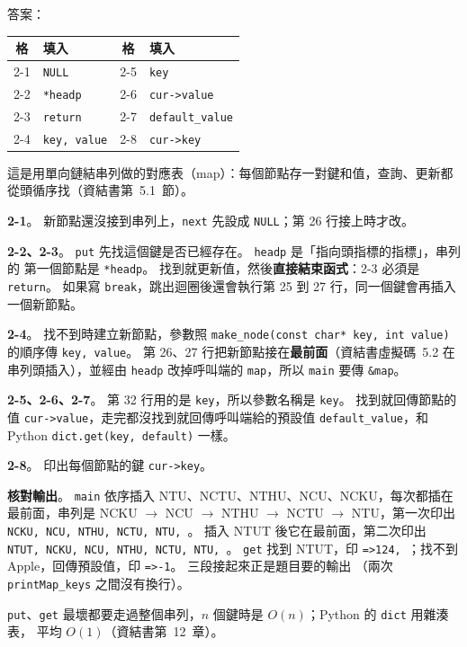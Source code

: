 \begin{pastsoln}
答案：
\begin{center}
\small
\begin{tabular}{cl|cl}
\toprule
格 & 填入 & 格 & 填入 \\
\midrule
2-1 & \texttt{NULL} & 2-5 & \texttt{key} \\
2-2 & \texttt{*headp} & 2-6 & \texttt{cur->value} \\
2-3 & \texttt{return} & 2-7 & \texttt{default\_value} \\
2-4 & \texttt{key, value} & 2-8 & \texttt{cur->key} \\
\bottomrule
\end{tabular}
\end{center}

這是用單向鏈結串列做的對應表（map）：每個節點存一對鍵和值，查詢、更新都從頭循序找（資結書第~5.1~節）。

\textbf{2-1}。 新節點還沒接到串列上，\texttt{next} 先設成 \texttt{NULL}；第 26 行接上時才改。

\textbf{2-2、2-3}。 \texttt{put} 先找這個鍵是否已經存在。 \texttt{headp} 是「指向頭指標的指標」，串列的
第一個節點是 \texttt{*headp}。 找到就更新值，然後\textbf{直接結束函式}：2-3 必須是 \texttt{return}。
如果寫 \texttt{break}，跳出迴圈後還會執行第 25 到 27 行，同一個鍵會再插入一個新節點。

\textbf{2-4}。 找不到時建立新節點，參數照 \texttt{make\_node(const char* key, int value)} 的順序傳
\texttt{key, value}。 第 26、27 行把新節點接在\textbf{最前面}（資結書虛擬碼~5.2 在串列頭插入），並經由
\texttt{headp} 改掉呼叫端的 \texttt{map}，所以 \texttt{main} 要傳 \texttt{\&map}。

\textbf{2-5、2-6、2-7}。 第 32 行用的是 \texttt{key}，所以參數名稱是 \texttt{key}。 找到就回傳節點的值
\texttt{cur->value}，走完都沒找到就回傳呼叫端給的預設值 \texttt{default\_value}，和 Python
\texttt{dict.get(key, default)} 一樣。

\textbf{2-8}。 印出每個節點的鍵 \texttt{cur->key}。

\textbf{核對輸出}。 \texttt{main} 依序插入 NTU、NCTU、NTHU、NCU、NCKU，每次都插在最前面，串列是
NCKU $\to$ NCU $\to$ NTHU $\to$ NCTU $\to$ NTU，第一次印出 \texttt{NCKU, NCU, NTHU, NCTU, NTU, }。
插入 NTUT 後它在最前面，第二次印出 \texttt{NTUT, NCKU, NCU, NTHU, NCTU, NTU, }。 \texttt{get} 找到
NTUT，印 \texttt{=>124, }；找不到 Apple，回傳預設值，印 \texttt{=>-1}。 三段接起來正是題目要的輸出
（兩次 \texttt{printMap\_keys} 之間沒有換行）。

\texttt{put}、\texttt{get} 最壞都要走過整個串列，$n$ 個鍵時是 $O(n)$；Python 的 \texttt{dict} 用雜湊表，
平均 $O(1)$（資結書第~12~章）。
\end{pastsoln}
